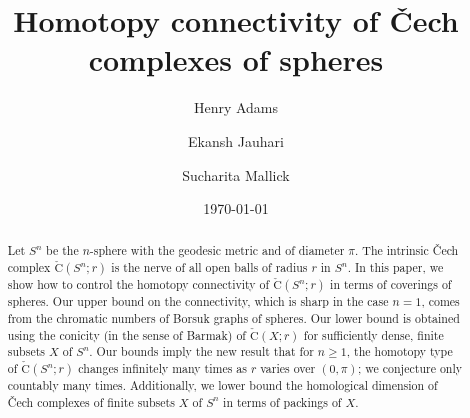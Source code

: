 \documentclass[11 pt,a4paper,twoside,reqno]{amsart}
\title{Homotopy connectivity of \v{C}ech complexes of spheres}
\author{Henry Adams}
\author{Ekansh Jauhari}
\author{Sucharita Mallick}
\date{\today}
\theoremstyle{definition}
\newcommand{\cech}[2]{\mathrm{\check{C}}(#1;#2)}
\DeclareMathOperator{\cov}{cov}
\begin{document}
\begin{abstract}
%
Let $S^n$ be the $n$-sphere with the geodesic metric and of diameter $\pi$.
The intrinsic \v{C}ech complex $\cech{S^n}{r}$ is the nerve of all open balls of radius $r$ in $S^n$.
In this paper, we show how to control the homotopy connectivity of $\cech{S^n}{r}$ in terms of coverings of spheres.
Our upper bound on the connectivity, which is sharp in the case $n=1$, comes from the chromatic numbers of Borsuk graphs of spheres.
Our lower bound is obtained using the conicity (in the sense of Barmak) of $\cech{X}{r}$ for sufficiently dense, finite subsets $X$ of $S^n$.
Our bounds imply the new result that for $n\ge 1$, the homotopy type of $\cech{S^n}{r}$ changes infinitely many times as $r$ varies over $(0,\pi)$; we conjecture only countably many times.
Additionally, we lower bound the homological dimension of \v{C}ech complexes of finite subsets $X$ of $S^n$ in terms of packings of $X$.
\end{abstract}

\maketitle


\end{document}
